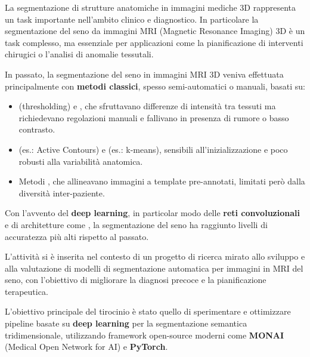
La segmentazione di strutture anatomiche in immagini mediche 3D rappresenta un task importante nell’ambito clinico e diagnostico. In particolare la segmentazione del seno da immagini MRI (Magnetic Resonance Imaging) 3D è un task complesso, ma essenziale per applicazioni come la pianificazione di interventi chirugici o l’analisi di anomalie tessutali.

In passato, la segmentazione del seno in immagini MRI 3D veniva effettuata principalmente con \textbf{metodi classici}, spesso semi-automatici o manuali, basati su:

\begin{itemize}
	\item {} (thresholding) e , che sfruttavano differenze di intensità tra tessuti ma richiedevano regolazioni manuali e fallivano in presenza di rumore o basso contrasto.
	\item {} (es.: Active Contours) e  (es.: k-means), sensibili all’inizializzazione e poco robusti alla variabilità anatomica.
	\item Metodi , che allineavano immagini a template pre-annotati, limitati però dalla diversità inter-paziente.
\end{itemize}

Con l’avvento del \textbf{deep learning}, in particolar modo delle \textbf{reti convoluzionali} e di architetture come  \cite{chen2021transunet}, la segmentazione del seno ha raggiunto livelli di accuratezza più alti rispetto al passato. 





L’attività si è inserita nel contesto di un progetto di ricerca mirato allo sviluppo e alla valutazione di modelli di segmentazione automatica per immagini in MRI del seno, con l’obiettivo di migliorare la diagnosi precoce e la pianificazione terapeutica.

L’obiettivo principale del tirocinio è stato quello di sperimentare e ottimizzare pipeline basate su \textbf{deep learning} per la segmentazione semantica tridimensionale, utilizzando framework open-source moderni come \textbf{MONAI} (Medical Open Network for AI) \cite{cardoso2022monai} e \textbf{PyTorch}.

